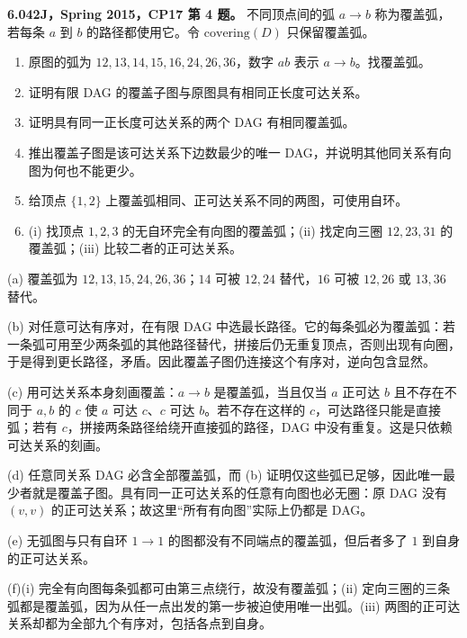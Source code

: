 \begin{exercise}\label{mit:6042-cp17-q4}
\textbf{6.042J，Spring 2015，CP17 第 4 题。}
不同顶点间的弧 $a\to b$ 称为覆盖弧，若每条 $a$ 到 $b$ 的路径都使用它。令 $\mathrm{covering}(D)$ 只保留覆盖弧。
\begin{enumerate}[label=(\alph*)]
\item 原图的弧为 $12,13,14,15,16,24,26,36$，数字 $ab$ 表示 $a\to b$。找覆盖弧。
\item 证明有限 DAG 的覆盖子图与原图具有相同正长度可达关系。
\item 证明具有同一正长度可达关系的两个 DAG 有相同覆盖弧。
\item 推出覆盖子图是该可达关系下边数最少的唯一 DAG，并说明其他同关系有向图为何也不能更少。
\item 给顶点 $\{1,2\}$ 上覆盖弧相同、正可达关系不同的两图，可使用自环。
\item (i) 找顶点 $1,2,3$ 的无自环完全有向图的覆盖弧；(ii) 找定向三圈 $12,23,31$ 的覆盖弧；(iii) 比较二者的正可达关系。
\end{enumerate}
\end{exercise}
\begin{solution}
(a) 覆盖弧为 $12,13,15,24,26,36$；$14$ 可被 $12,24$ 替代，$16$ 可被 $12,26$ 或 $13,36$ 替代。

(b) 对任意可达有序对，在有限 DAG 中选最长路径。它的每条弧必为覆盖弧：若一条弧可用至少两条弧的其他路径替代，拼接后仍无重复顶点，否则出现有向圈，于是得到更长路径，矛盾。因此覆盖子图仍连接这个有序对，逆向包含显然。

(c) 用可达关系本身刻画覆盖：$a\to b$ 是覆盖弧，当且仅当 $a$ 正可达 $b$ 且不存在不同于 $a,b$ 的 $c$ 使 $a$ 可达 $c$、$c$ 可达 $b$。若不存在这样的 $c$，可达路径只能是直接弧；若有 $c$，拼接两条路径给绕开直接弧的路径，DAG 中没有重复。这是只依赖可达关系的刻画。

(d) 任意同关系 DAG 必含全部覆盖弧，而 (b) 证明仅这些弧已足够，因此唯一最少者就是覆盖子图。具有同一正可达关系的任意有向图也必无圈：原 DAG 没有 $(v,v)$ 的正可达关系；故这里“所有有向图”实际上仍都是 DAG。

(e) 无弧图与只有自环 $1\to1$ 的图都没有不同端点的覆盖弧，但后者多了 $1$ 到自身的正可达关系。

(f)(i) 完全有向图每条弧都可由第三点绕行，故没有覆盖弧；(ii) 定向三圈的三条弧都是覆盖弧，因为从任一点出发的第一步被迫使用唯一出弧。(iii) 两图的正可达关系却都为全部九个有序对，包括各点到自身。
\end{solution}

